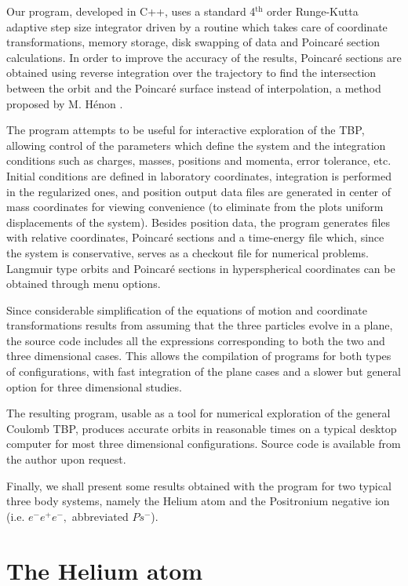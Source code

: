 \documentclass[thmsa]{article}
\begin{document}
Our program, developed in C++, uses a standard 4$^{\text{th}}$ order
Runge-Kutta adaptive step size integrator \cite{NumRecipes} driven by a
routine which takes care of coordinate transformations, memory storage, disk
swapping of data and Poincar\'e section calculations. In order to improve
the accuracy of the results, Poincar\'e sections are obtained using reverse
integration over the trajectory to find the intersection between the orbit
and the Poincar\'e surface instead of interpolation, a method proposed by M.
H\'enon \cite{Henon(Poincare)}.

The program attempts to be useful for interactive exploration of the TBP,
allowing control of the parameters which define the system and the
integration conditions such as charges, masses, positions and momenta, error
tolerance, etc. Initial conditions are defined in laboratory coordinates,
integration is performed in the regularized ones, and position output data
files are generated in center of mass coordinates for viewing convenience
(to eliminate from the plots uniform displacements of the system). Besides
position data, the program generates files with relative coordinates,
Poincar\'e sections and a time-energy file which, since the system is
conservative, serves as a checkout file for numerical problems. Langmuir
type orbits \cite{Dimitri} and Poincar\'e sections in hyperspherical
coordinates can be obtained through menu options.

Since considerable simplification of the equations of motion and coordinate
transformations results from assuming that the three particles evolve in a
plane, the source code includes all the expressions corresponding to both
the two and three dimensional cases. This allows the compilation of programs
for both types of configurations, with fast integration of the plane cases
and a slower but general option for three dimensional studies.

The resulting program, usable as a tool for numerical exploration of the
general Coulomb TBP, produces accurate orbits in reasonable times on a
typical desktop computer for most three dimensional configurations. Source
code is available from the author upon request.

Finally, we shall present some results obtained with the program for two
typical three body systems, namely the Helium atom and the Positronium
negative ion (i.e. $e^{-}e^{+}e^{-},$ abbreviated $Ps^{-}$).

\section{The Helium atom}
\end{document}
